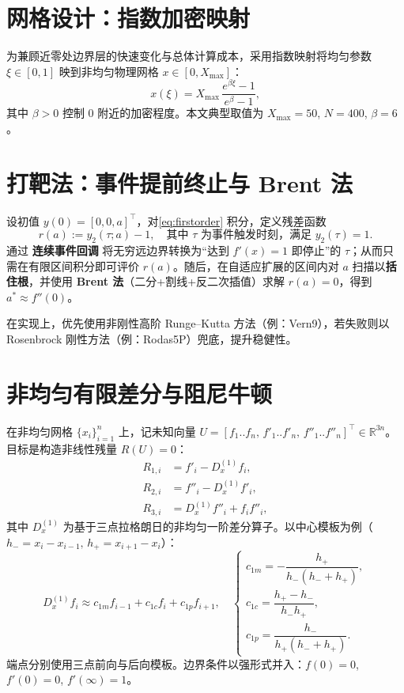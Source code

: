\documentclass[12pt]{article}
\begin{document}
\section{网格设计：指数加密映射}
为兼顾近零处边界层的快速变化与总体计算成本，采用指数映射将均匀参数 \(\xi\in[0,1]\) 映到非均匀物理网格 \(x\in[0,X_{\max}]\)：
\begin{equation}
  x(\xi) = X_{\max}\, \frac{e^{\beta \xi}-1}{e^{\beta}-1},
\end{equation}
其中 \(\beta>0\) 控制 0 附近的加密程度。本文典型取值为 \(X_{\max}=50\), \(N=400\), \(\beta=6\)。

\section{打靶法：事件提前终止与 Brent 法}
设初值 \(y(0)=[0,0,a]^\top\)，对\eqref{eq:firstorder} 积分，定义残差函数
\begin{equation}
  r(a) := y_2(\tau;a) - 1, \quad \text{其中 } \tau \text{ 为事件触发时刻，满足 } y_2(\tau)=1.
\end{equation}
通过 \textbf{连续事件回调} 将无穷远边界转换为“达到 \(f'(x)=1\) 即停止”的 \(\tau\)；从而只需在有限区间积分即可评价 \(r(a)\)。随后，在自适应扩展的区间内对 \(a\) 扫描以\textbf{括住根}，并使用 \textbf{Brent 法}（二分+割线+反二次插值）求解 \(r(a)=0\)，得到 \(a^*\approx f''(0)\)。

在实现上，优先使用非刚性高阶 Runge–Kutta 方法（例：Vern9），若失败则以 Rosenbrock 刚性方法（例：Rodas5P）兜底，提升稳健性。

\section{非均匀有限差分与阻尼牛顿}
在非均匀网格 \(\{x_i\}_{i=1}^n\) 上，记未知向量
\(U=[f_1..f_n,\, f'_1..f'_n,\, f''_1..f''_n]^\top\in\mathbb{R}^{3n}\)。目标是构造非线性残量 \(R(U)=0\)：
\begin{align}
  R_{1,i} &= f'_i - D_x^{(1)} f_i, \\
  R_{2,i} &= f''_i - D_x^{(1)} f'_i, \\
  R_{3,i} &= D_x^{(1)} f''_i + f_i f''_i,
\end{align}
其中 \(D_x^{(1)}\) 为基于三点拉格朗日的非均匀一阶差分算子。以中心模板为例（\(h_- = x_i-x_{i-1},\, h_+=x_{i+1}-x_i\)）：
\begin{equation}
  D_x^{(1)} f_i \approx c_{1m} f_{i-1} + c_{1c} f_i + c_{1p} f_{i+1},\quad
  \begin{cases}
    c_{1m}=-\dfrac{h_+}{h_-(h_-+h_+)},\\[4pt]
    c_{1c}=\dfrac{h_+-h_-}{h_- h_+},\\[4pt]
    c_{1p}=\dfrac{h_-}{h_+(h_-+h_+)}.
  \end{cases}
  \label{eq:center}
\end{equation}
端点分别使用三点前向与后向模板。边界条件以强形式并入：\(f(0)=0\), \(f'(0)=0\), \(f'(\infty)=1\)。
\end{document}
